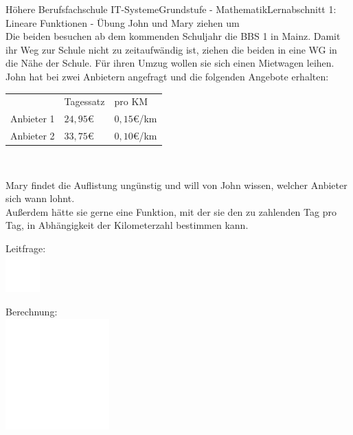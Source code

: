 \documentclass[oneside,openany,headings=optiontotoc,11pt,numbers=noenddot]{scrreprt}
\begin{document}
\begin{worksheet}{Höhere Berufsfachschule IT-Systeme}{Grundstufe - Mathematik}{Lernabschnitt 1: Lineare Funktionen - Übung}
		\setcounter{page}{1}
		\noindent
		\LARGE John und Mary ziehen um\\
		\normalsize
		\noindent
		Die beiden besuchen ab dem kommenden Schuljahr die BBS 1 in Mainz. Damit ihr Weg zur Schule nicht zu zeitaufwändig ist, ziehen die beiden in eine WG in die Nähe der Schule. Für ihren Umzug wollen sie sich einen Mietwagen leihen.\\
		John hat bei zwei Anbietern angefragt und die folgenden Angebote erhalten:\\
		\par\noindent
		\begin{tabularx}{\textwidth}{|l|l|l|}
			\cline{1-3}
			& Tagessatz & pro KM\\
			\cline{1-3}
			Anbieter 1 & \(24,95\)\euro{} & \(0,15\)\euro{}/km\\
			\cline{1-3}
			Anbieter 2 & \(33,75\)\euro{} & \(0,10\)\euro{}/km\\
			\cline{1-3}
		\end{tabularx}\\
		\par\noindent
		Mary findet die Auflistung ungünstig und will von John wissen, welcher Anbieter sich wann lohnt.\\
		Außerdem hätte sie gerne eine Funktion, mit der sie den zu zahlenden Tag pro Tag, in Abhängigkeit der Kilometerzahl bestimmen kann.
		\begin{framed}
			\noindent
			\small{\color{codegray}Leitfrage:}\\
			\includegraphics[width=0.1\textwidth]{../../empty.jpg}\\
		\end{framed}
		\begin{framed}
			\noindent
			\small{\color{codegray}Berechnung:}\\
			\includegraphics[width=0.3\textwidth]{../../empty.jpg}\\

\end{framed}
\end{worksheet}
\end{document}
